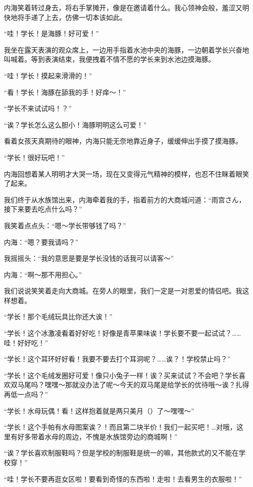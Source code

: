 内海笑着转过身去，将右手掌摊开，像是在邀请着什么。我心领神会般，羞涩又明快地将手递了上去，仿佛一切本该如此。







“哇！学长！是海豚！好可爱！”

我坐在露天表演的观众席上，一边用手指着水池中央的海豚，一边朝着学长兴奋地叫喊着。等到表演结束，我便拽着不情不愿的学长来到水池边摸海豚。

“哇！学长！摸起来滑滑的！”

“看！学长！海豚在舔我的手！好痒～！”

“学长不来试试吗！？”

“诶？学长怎么这么胆小！海豚明明这么可爱！”

看着女孩天真期待的眼神，内海只能无奈地靠近身子，缓缓伸出手摸了摸海豚。

“学长！很好玩吧！”

内海回想着某人明明才大哭一场，现在又变得元气精神的模样，也忍不住眯着眼笑了起来。

我们终于从水族馆出来，内海牵着我的手，指着前方的大商城问道：“雨宫さん，接下来要去吃点什么吗？”

我笑着点点头：“嗯～学长带够钱了吗？”

内海：“嗯？要我请吗？”

我摇摇头：“我的意思是要是学长没钱的话我可以请客～”

内海：“啊～那不用担心。”

我们说说笑笑着走向大商城。在旁人的眼里，我们一定是一对恩爱的情侣吧。我这样想着。

“学长！那个毛绒玩具比你还大诶！”

“学长！这个冰激凌看着好好吃！好像是青苹果味诶！学长要不要一起试试？……哇！好好吃！”

“学长！这个耳环好好看！我要不要去打个耳洞呢？……诶？！学校禁止吗？”

“学长！这个毛绒发圈好可爱！像只小兔子一样！诶？买来试试？不会吧？学长喜欢双马尾吗？嘿嘿～那就没办法了呢～今天的双马尾是给学长的优待哦～诶？扎得再低一点吗？”

“学长！水母玩偶！看！这样抱着就是两只美月（）了～嘿嘿～”

“学长！这个手帕有水母图案诶？！而且第二块半价！我们一起买吧！…对哦，这里有好多带着水母的周边，不愧是水族馆旁边的商城啊！”

“诶？学长喜欢制服鞋吗？但是学校的制服鞋是统一的嘛，其他款式的又不能在学校穿！”

“哇！学长不要再逛女区啦！要看到奇怪的东西啦！走啦！去看男生的衣服啦！”

